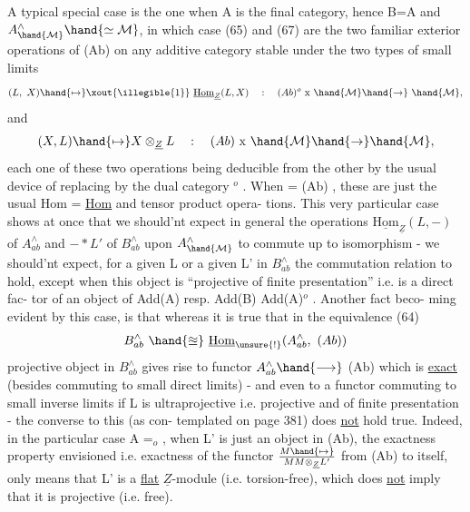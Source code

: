 A typical special case is the one when A is the final category,
hence B=A and $A^\wedge_{\hand{\mathcal{M}}}\hand{\simeq \mathcal{M}}$, in which case (65) and (67) are the two familiar
exterior operations of (Ab) on any additive category stable under the
two types of small limits
\[ (L,\ X)\hand{\mapsto}\xout{\illegible{1}}\ \underline{\mathrm{Hom}}_{\underline{Z}}(L,X) \quad : \quad (Ab)^{o}\ \mathrm{x}\ \hand{\mathcal{M}}\hand{\to}\ \hand{\mathcal{M}}, \]
and
\[ (X,L)\hand{\mapsto} X\otimes_{\underline{Z}}L \quad : \quad (Ab)\ \mathrm{x}\ \hand{\mathcal{M}}\hand{\to}\hand{\mathcal{M}}, \]
each one of these two operations being deducible from the other by the
usual device of replacing  by the dual category $^{o}$ .  When = (Ab) ,
these are just the usual   Hom = \uline{Hom}  and tensor product opera-%
tions.  This very particular case shows at once that we should'nt expect
in general the operations  $\underline{\mathrm{Hom}}_{\underline{Z}}(L,-)$ of $A^\wedge_{ab}$  and  $-*L'$  of $B^\wedge_{ab}$  upon
$A^\wedge_{\hand{\mathcal{M}}}$  to commute up to isomorphism  -  we should'nt expect,  for a given
L  or a given L' in $B^\wedge_{ab}$ the commutation relation to hold,  except when
this object is ``projective of finite presentation''  i.e. is a direct fac-%
tor of an object of Add(A)  resp.  Add(B) \hand{$\approxeq$} Add(A)$^{o}$ .  Another fact beco-%
ming evident by this  case,  is that whereas it is true that
in the equivalence (64)
\[ B^\wedge_{ab}\ \hand{\approxeq}\ \underline{\mathrm{Hom}}_{\unsure{!}}(A^\wedge_{ab},\ (Ab)) \]
 projective object in $B^\wedge_{ab}$ gives rise to  functor  $A^\wedge_{ab}\hand{\longrightarrow}$ (Ab) which is
\uline{exact} (besides commuting to  small direct limits)  -  and even to a
functor commuting to small inverse limits if L is ultraprojective i.e.
projective and of finite presentation -  the converse to this (as con-%
templated on page 381) does \uline{not} hold true.  Indeed,  in the particular
case A =\hand{$\Delta$}$_{o}$ ,  when L' is just an  object in (Ab),  the
exactness property envisioned i.e. exactness of the functor  $M\hand{\mapsto}\over{M}{M}\otimes_{\underline{Z}}L'$
from (Ab) to itself,  only means that L' is a \uline{flat}  $\underline{Z}$-module (i.e.
torsion-free),  which does \uline{not} imply that it is projective (i.e. free).

